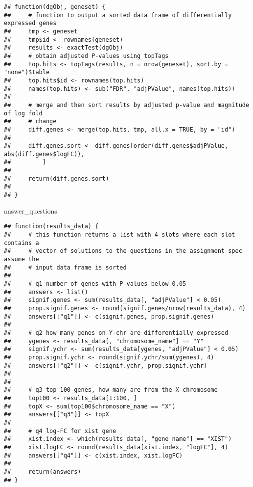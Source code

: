 \documentclass[]{article}
\newenvironment{Shaded}{\begin{snugshade}}{\end{snugshade}}
\newcommand{\NormalTok}[1]{{#1}}
\begin{document}
\begin{verbatim}
## function(dgObj, geneset) {
##     # function to output a sorted data frame of differentially expressed genes
##     tmp <- geneset
##     tmp$id <- rownames(geneset)
##     results <- exactTest(dgObj)
##     # obtain adjusted P-values using topTags
##     top.hits <- topTags(results, n = nrow(geneset), sort.by = "none")$table
##     top.hits$id <- rownames(top.hits)
##     names(top.hits) <- sub("FDR", "adjPValue", names(top.hits))
##     
##     # merge and then sort results by adjusted p-value and magnitude of log fold
##     # change
##     diff.genes <- merge(top.hits, tmp, all.x = TRUE, by = "id")
##     
##     diff.genes.sort <- diff.genes[order(diff.genes$adjPValue, -abs(diff.genes$logFC)), 
##         ]
##     
##     return(diff.genes.sort)
##     
## }
\end{verbatim}

\begin{Shaded}
\begin{Highlighting}[]
\NormalTok{answer_questions}
\end{Highlighting}
\end{Shaded}

\begin{verbatim}
## function(results_data) {
##     # this function returns a list with 4 slots where each slot contains a
##     # vector of solutions to the questions in the assignment spec assume the
##     # input data frame is sorted
##     
##     # q1 number of genes with P-values below 0.05
##     answers <- list()
##     signif.genes <- sum(results_data[, "adjPValue"] < 0.05)
##     prop.signif.genes <- round(signif.genes/nrow(results_data), 4)
##     answers[["q1"]] <- c(signif.genes, prop.signif.genes)
##     
##     # q2 how many genes on Y-chr are differentially expressed
##     ygenes <- results_data[, "chromosome_name"] == "Y"
##     signif.ychr <- sum(results_data[ygenes, "adjPValue"] < 0.05)
##     prop.signif.ychr <- round(signif.ychr/sum(ygenes), 4)
##     answers[["q2"]] <- c(signif.ychr, prop.signif.ychr)
##     
##     
##     # q3 top 100 genes, how many are from the X chromosome
##     top100 <- results_data[1:100, ]
##     topX <- sum(top100$chromosome_name == "X")
##     answers[["q3"]] <- topX
##     
##     # q4 log-FC for xist gene
##     xist.index <- which(results_data[, "gene_name"] == "XIST")
##     xist.logFC <- round(results_data[xist.index, "logFC"], 4)
##     answers[["q4"]] <- c(xist.index, xist.logFC)
##     
##     return(answers)
## }
\end{verbatim}
\end{document}
